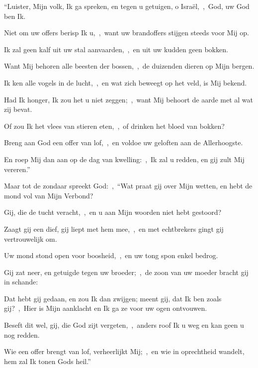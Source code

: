 \documentclass[12pt,twoside,a5paper]{article}
\begin{document}

\begin{halfparskip}
  ``Luister, Mijn volk, Ik ga spreken, en tegen u getuigen, o Israël,~\sep\ God, uw God ben Ik.

  Niet om uw offers berisp Ik u,~\sep\ want uw brandoffers stijgen steeds voor Mij op.

  Ik zal geen kalf uit uw stal aanvaarden,~\sep\ en uit uw kudden geen bokken.

  Want Mij behoren alle beesten der bossen,~\sep\ de duizenden dieren op Mijn bergen.

  Ik ken alle vogels in de lucht,~\sep\ en wat zich beweegt op het veld, is Mij bekend.

  Had Ik honger, Ik zou het u niet zeggen;~\sep\ want Mij behoort de aarde met al wat zij bevat.

  Of zou Ik het vlees van stieren eten,~\sep\ of drinken het bloed van bokken?

  Breng aan God een offer van lof,~\sep\ en voldoe uw geloften aan de Allerhoogste.

  En roep Mij dan aan op de dag van kwelling:~\sep\ Ik zal u redden, en gij zult Mij vereren.''
\end{halfparskip}


\begin{halfparskip}
  Maar tot de zondaar spreekt God:~\sep\ ``Wat praat gij over Mijn wetten, en hebt de mond vol van Mijn Verbond?

  Gij, die de tucht veracht,~\sep\ en u aan Mijn woorden niet hebt gestoord?

  Zaagt gij een dief, gij liept met hem mee,~\sep\ en met echtbrekers gingt gij vertrouwelijk om.

  Uw mond stond open voor boosheid,~\sep\ en uw tong spon enkel bedrog.

  Gij zat neer, en getuigde tegen uw broeder;~\sep\ de zoon van uw moeder bracht gij in schande:

  Dat hebt gij gedaan, en zou Ik dan zwijgen; meent gij, dat Ik ben zoals gij?~\sep\ Hier is Mijn aanklacht en Ik ga ze voor uw ogen ontvouwen.

  Beseft dit wel, gij, die God zijt vergeten,~\sep\ anders roof Ik u weg en kan geen u nog redden.

  Wie een offer brengt van lof, verheerlijkt Mij;~\sep\ en wie in oprechtheid wandelt, hem zal Ik tonen Gods heil.''
\end{halfparskip}
\end{document}
